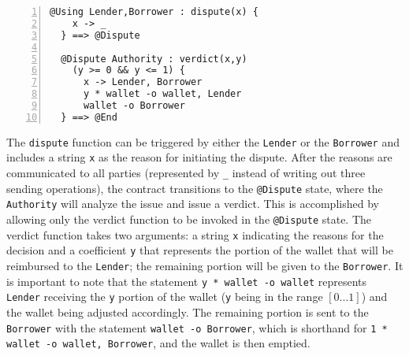\begin{Verbatim}[numbers=left,xleftmargin=1cm,firstnumber=1,breaklines=true,breakanywhere=true,tabsize=2]
  @Using Lender,Borrower : dispute(x) { 
    x -> _
  } ==> @Dispute

  @Dispute Authority : verdict(x,y) 
    (y >= 0 && y <= 1) {
      x -> Lender, Borrower 
      y * wallet -o wallet, Lender 
      wallet -o Borrower
  } ==> @End
\end{Verbatim}

The \verb|dispute| function can be triggered by either the \verb|Lender| or the \verb|Borrower| and 
includes a string \verb|x| as the reason for initiating the dispute. After the reasons are communicated to 
all parties (represented by \verb|_| instead of writing out three sending operations), the contract 
transitions to the \verb|@Dispute| state, where the \verb|Authority| will analyze the issue and issue a 
verdict. This is accomplished by allowing only the verdict function to be invoked in the \verb|@Dispute| 
state. The verdict function takes two arguments: a string \verb|x| indicating the reasons for the decision 
and a coefficient \verb|y| that represents the portion of the wallet that will be reimbursed to the 
\verb|Lender|; the remaining portion will be given to the \verb|Borrower|. It is important to note that the 
statement \verb|y * wallet -o wallet| represents \verb|Lender| receiving the \verb|y| portion of the wallet 
(\verb|y| being in the range $[0...1]$) and the wallet being adjusted accordingly. The remaining portion is 
sent to the \verb|Borrower| with the statement \verb|wallet -o Borrower|, which is shorthand for 
\verb|1 * wallet -o wallet, Borrower|, and the wallet is then emptied.
